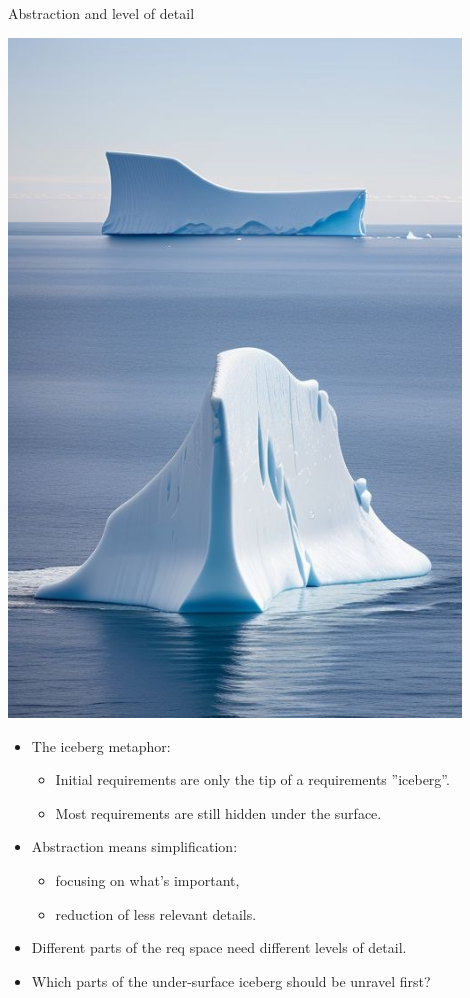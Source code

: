 \begin{Slide}{Abstraction and level of detail}

\begin{minipage}[t]{0.4\textwidth}
\vspace{-0.5em}\includegraphics[width=0.9\textwidth]{../img/iceberg4}
\end{minipage}%
\begin{minipage}[t]{0.6\textwidth}
\begin{itemize}
\item The iceberg metaphor: 
\begin{itemize}
\item Initial requirements are only the tip of a requirements ''iceberg''.
\item Most requirements are still hidden under the surface.
\end{itemize}
\item Abstraction means simplification:
\begin{itemize}
\item focusing on what's important,
\item reduction of less relevant details.
\end{itemize}
\item Different parts of the req space need different levels of detail.
\item Which parts of the under-surface iceberg should be unravel first?
\end{itemize}
\end{minipage}%

\end{Slide}
